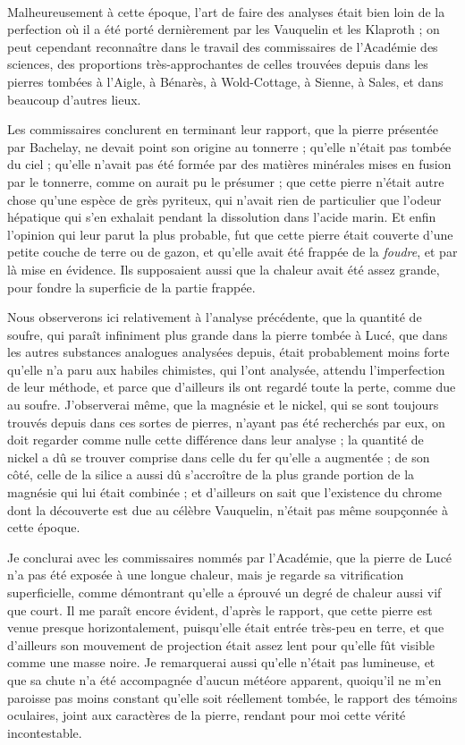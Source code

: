 \documentclass[a4paper, 12pt, oneside, french]{article}
\begin{document}
\paragraph{}
Malheureusement à cette époque, l'art de faire des analyses était bien loin de la perfection où il a été porté dernièrement par les Vauquelin et les Klaproth ; on peut cependant reconnaître dans le travail des commissaires de l'Académie des sciences, des proportions très-approchantes de celles trouvées depuis dans les pierres tombées à l'Aigle, à Bénarès, à Wold-Cottage, à Sienne, à Sales, et dans beaucoup d'autres lieux.

Les commissaires conclurent en terminant leur rapport, que la pierre présentée par Bachelay, ne devait point son origine au tonnerre ; qu'elle n'était pas tombée du ciel ; qu'elle n'avait pas été formée par des matières minérales mises en fusion par le tonnerre, comme on aurait pu le présumer ; que cette pierre n'était autre chose qu'une espèce de grès pyriteux, qui n'avait rien de particulier que l'odeur hépatique qui s'en exhalait pendant la dissolution dans l'acide marin. Et enfin l'opinion qui leur parut la plus probable, fut que cette pierre était couverte d'une petite couche de terre ou de gazon, et qu'elle avait été frappée de la \emph{foudre}, et par là mise en évidence. Ils supposaient aussi que la chaleur avait été assez grande, pour fondre la superficie de la partie frappée.

Nous observerons ici relativement à l'analyse précédente, que la quantité de soufre, qui paraît infiniment plus grande dans la pierre tombée à Lucé, que dans les autres substances analogues analysées depuis, était probablement moins forte qu'elle n'a paru aux habiles chimistes, qui l'ont analysée, attendu l'imperfection de leur méthode, et parce que d'ailleurs ils ont regardé toute la perte, comme due au soufre. J'observerai même, que la magnésie et le nickel, qui se sont toujours trouvés depuis dans ces sortes de pierres, n'ayant pas été recherchés par eux, on doit regarder comme nulle cette différence dans leur analyse ; la quantité de nickel a dû se trouver comprise dans celle du fer qu'elle a augmentée ; de son côté, celle de la silice a aussi dû s'accroître de la plus grande portion de la magnésie qui lui était combinée ; et d'ailleurs on sait que l'existence du chrome dont la découverte est due au célèbre Vauquelin, n'était pas même soupçonnée à cette époque.

Je conclurai avec les commissaires nommés par l'Académie, que la pierre de Lucé n'a pas été exposée à une longue chaleur, mais je regarde sa vitrification superficielle, comme démontrant qu'elle a éprouvé un degré de chaleur aussi vif que court. Il me paraît encore évident, d'après le rapport, que cette pierre est venue presque horizontalement, puisqu'elle était entrée très-peu en terre, et que d'ailleurs son mouvement de projection était assez lent pour qu'elle fût visible comme une masse noire. Je remarquerai aussi qu'elle n'était pas lumineuse, et que sa chute n'a été accompagnée d'aucun météore apparent, quoiqu'il ne m'en paroisse pas moins constant qu'elle soit réellement tombée, le rapport des témoins oculaires, joint aux caractères de la pierre, rendant pour moi cette vérité incontestable.
\end{document}
